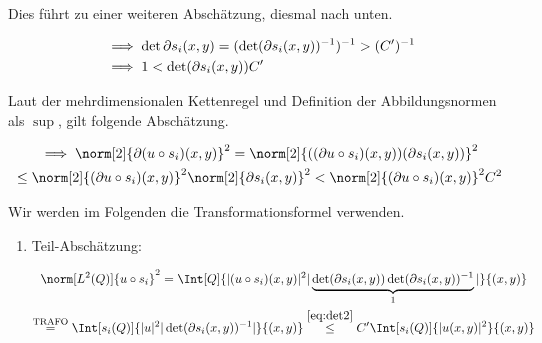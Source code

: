 \begin{solution}
\begin{enumerate}[label = \textbf{\alph*)}]
\begin{enumerate}[label = \arabic*.]
    Dies führt zu einer weiteren Abschätzung, diesmal nach unten.

    \begin{align}
      &
      \notag
      \implies
      \det \partial s_i(x, y)
      =
      (\det (\partial s_i(x, y))^{-1})^{-1}
      >
      (C^\prime)^{-1} \\
      &
      \label{eq:det3}
      \implies
      1
      <
      \det (\partial s_i(x, y))
      C^\prime
    \end{align}

    Laut der mehrdimensionalen Kettenregel und Definition der Abbildungsnormen als $\sup$, gilt folgende Abschätzung.

    \begin{multline}
      \label{eq:Kettenregel-Ungleichung}
      \implies
      \norm[2]{\partial (u \circ s_i)(x, y)}^2
      =
      \norm[2]
      {
        (
          (\partial u \circ s_i)(x, y)
        )(
          \partial s_i(x, y)
        )}^2 \\
      \leq
      \norm[2]{(\partial u \circ s_i)(x, y)}^2
      \norm[2]{\partial s_i(x, y)}^2
      <
      \norm[2]{(\partial u \circ s_i)(x, y)}^2
      C^2
    \end{multline}

    Wir werden im Folgenden die Transformationsformel verwenden.


    \begin{enumerate}[label = \arabic*.]

      \item Teil-Abschätzung:

      \begin{multline}
        \label{eq:part1}
        \norm[L^2(Q)]{u \circ s_i}^2
        =
        \Int[Q]
        {
          |(u \circ s_i)(x, y)|^2
          |
            \underbrace
            {
              \det (\partial s_i(x, y))
              \det (\partial s_i(x, y))^{-1}
            }_1
          |
        }{(x, y)} \\
        \stackrel
        {
          \text{TRAFO}
        }{=}
        \Int[s_i(Q)]
        {
          |u|^2
          |\det (\partial s_i(x, y))^{-1}|
        }{(x, y)}
        \stackrel{\eqref{eq:det2}}{\leq}
        C^\prime
        \Int[s_i(Q)]{|u(x, y)|^2}{(x, y)}
      \end{multline}


\end{enumerate}
\end{enumerate}
\end{enumerate}
\end{solution}
